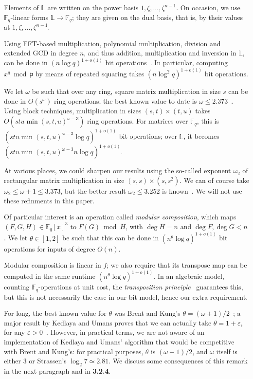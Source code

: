 \documentclass[sigconf]{acmart}
\newcommand{\F}{\mathbb{F}}
\renewcommand{\L}{\mathbb{L}}
\newcommand{\frakp}{\mathfrak{p}}
\begin{document}
\smallskip{}  Elements of $\L$ are written on 
the power basis $1,\zeta,\dots,\zeta^{n-1}$. On occasion, we use 
$\F_q$-linear forms $\L \to \F_q$; they are given on the dual 
basis, that is, by their values at $1,\zeta,\dots,\zeta^{n-1}$.

Using FFT-based multiplication,
polynomial multiplication, division and extended GCD in degree $n$,
and thus addition, multiplication and inversion in $\L$, can be done
in $(n\log q)^{1+o(1)}$ bit
operations~\cite{Gathen:2003:MCA:945759}. In particular, computing
$x^q \bmod \frakp$ by means of repeated squaring takes $(n\log^2
q)^{1+o(1)}$ bit operations.

\smallskip{}  We let $\omega$ be such that over any
ring, square matrix multiplication in size $s$ can be done in
$O(s^\omega)$ ring operations; the best known value to date is $\omega
\le 2.373$~\cite{CoWi90,LeGall14}. Using block techniques,
multiplication in sizes $(s,t) \times (t,u)$ takes $O(stu
\min(s,t,u)^{\omega-3})$ ring operations. For matrices over
$\F_q$, this is $(stu \min(s,t,u)^{\omega-3} \log q)^{1+o(1)}$ bit
operations; over $\L$, it becomes $(stu \min(s,t,u)^{\omega-3}
n\log q)^{1+o(1)}$.

At various places, we could sharpen our results using the so-called
exponent $\omega_2$ of rectangular matrix multiplication in size
$(s,s) \times (s,s^2)$. We can of course take $\omega_2\le\omega+1 \le
3.373$, but the better result $\omega_2 \le 3.252$ is
known~\cite{LeUr18}. We will not use these refinments in this paper.

\smallskip{} Of particular interest is an operation
called {\em modular composition}, which maps $(F,G,H) \in \F_q[x]^3$
to $F(G) \bmod H$, with $\deg H=n$ and $\deg F,\deg G < n$.  We let
$\theta \in [1,2]$ be such that this can be done in $(n^\theta
\log q)^{1+o(1)}$ bit operations for inputs of degree $O(n)$.

Modular composition is linear in $f$; we also require that its
transpose map can be computed in the same runtime $(n^\theta
\log q)^{1+o(1)}$. In an algebraic model, counting $\F_q$-operations
at unit cost, the {\em transposition principle}~\cite{KaKiBs88}
guarantees this, but this is not necessarily the case in our bit
model, hence our extra requirement.

For long, the best known value for $\theta$ was Brent and Kung's
$\theta = (\omega+1)/2$~\cite{BrKu78}; a major result by Kedlaya and
Umans proves that we can actually take $\theta = 1+\varepsilon$, for
any $\varepsilon >
0$~\cite{Kedlaya:2011:FPF:2340436.2340448}. However, in practical
terms, we are not aware of an implementation of Kedlaya and Umans'
algorithm that would be competitive with Brent and Kung's: for
practical purposes, $\theta$ is $(\omega+1)/2$, and $\omega$ itself is
either 3 or Strassen's $\log_2 7 \simeq 2.81$. We discuss some
consequences of this remark in the next paragraph and in {\bf 3.2.4}.
\end{document}
